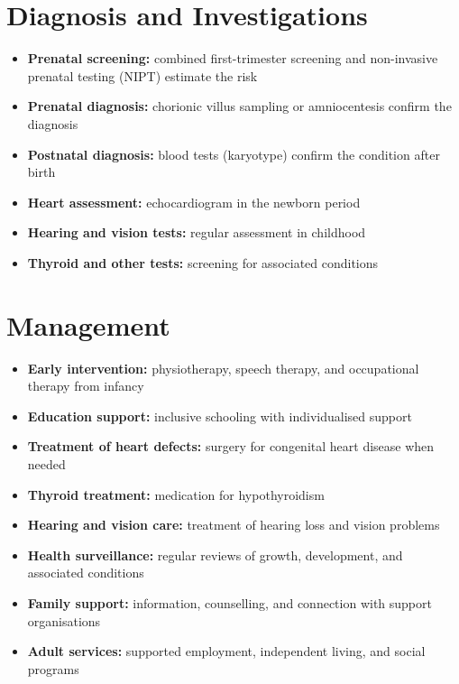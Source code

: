 \section*{Diagnosis and Investigations}
\begin{itemize}
    \item \textbf{Prenatal screening:} combined first-trimester screening and non-invasive prenatal testing (NIPT) estimate the risk
    \item \textbf{Prenatal diagnosis:} chorionic villus sampling or amniocentesis confirm the diagnosis
    \item \textbf{Postnatal diagnosis:} blood tests (karyotype) confirm the condition after birth
    \item \textbf{Heart assessment:} echocardiogram in the newborn period
    \item \textbf{Hearing and vision tests:} regular assessment in childhood
    \item \textbf{Thyroid and other tests:} screening for associated conditions
\end{itemize}

\section*{Management}
\begin{itemize}
    \item \textbf{Early intervention:} physiotherapy, speech therapy, and occupational therapy from infancy
    \item \textbf{Education support:} inclusive schooling with individualised support
    \item \textbf{Treatment of heart defects:} surgery for congenital heart disease when needed
    \item \textbf{Thyroid treatment:} medication for hypothyroidism
    \item \textbf{Hearing and vision care:} treatment of hearing loss and vision problems
    \item \textbf{Health surveillance:} regular reviews of growth, development, and associated conditions
    \item \textbf{Family support:} information, counselling, and connection with support organisations
    \item \textbf{Adult services:} supported employment, independent living, and social programs
\end{itemize}

